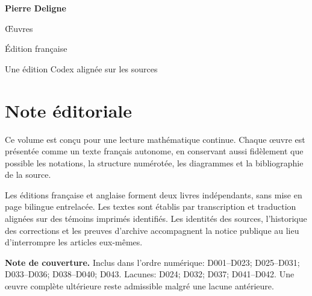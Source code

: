 \documentclass[11pt,a4paper]{article}
\begin{document}
\begin{titlepage}
  \pagecolor{DeligneBlue}
  \color{white}
  \vspace*{34mm}
  {\fontsize{30}{36}\selectfont\bfseries Pierre Deligne\par}
  \vspace{7mm}
  {\fontsize{18}{23}\selectfont Œuvres\par}
  \vspace{4mm}
  {\large Édition française\par}
  \vfill
  {\normalsize Une édition Codex alignée sur les sources\par}
\end{titlepage}
\setcounter{page}{2}
\nopagecolor
\color{DeligneInk}
\section*{Note éditoriale}
Ce volume est conçu pour une lecture mathématique continue. Chaque œuvre est présentée comme un texte français autonome, en conservant aussi fidèlement que possible les notations, la structure numérotée, les diagrammes et la bibliographie de la source.

Les éditions française et anglaise forment deux livres indépendants, sans mise en page bilingue entrelacée. Les textes sont établis par transcription et traduction alignées sur des témoins imprimés identifiés. Les identités des sources, l'historique des corrections et les preuves d'archive accompagnent la notice publique au lieu d'interrompre les articles eux-mêmes.

\textbf{Note de couverture.} Inclus dans l'ordre numérique: D001--D023; D025--D031; D033--D036; D038--D040; D043. Lacunes: D024; D032; D037; D041--D042. Une œuvre complète ultérieure reste admissible malgré une lacune antérieure.
\end{document}
